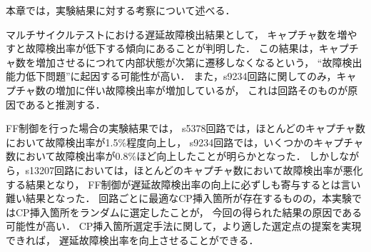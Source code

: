 本章では，実験結果に対する考察について述べる．

マルチサイクルテストにおける遅延故障検出結果として，
キャプチャ数を増やすと故障検出率が低下する傾向にあることが判明した．
この結果は，キャプチャ数を増加させるにつれて内部状態が次第に遷移しなくなるという，
``故障検出能力低下問題''に起因する可能性が高い．
また，s9234回路に関してのみ，キャプチャ数の増加に伴い故障検出率が増加しているが，
これは回路そのものが原因であると推測する．

FF制御を行った場合の実験結果では，
s5378回路では，ほとんどのキャプチャ数において故障検出率が1.5\%程度向上し，
s9234回路では，いくつかのキャプチャ数において故障検出率が0.8\%ほど向上したことが明らかとなった．
しかしながら，s13207回路においては，ほとんどのキャプチャ数において故障検出率が悪化する結果となり，
FF制御が遅延故障検出率の向上に必ずしも寄与するとは言い難い結果となった．
回路ごとに最適なCP挿入箇所が存在するものの，本実験ではCP挿入箇所をランダムに選定したことが，
今回の得られた結果の原因である可能性が高い．
CP挿入箇所選定手法に関して，より適した選定点の提案を実現できれば，
遅延故障検出率を向上させることができる．